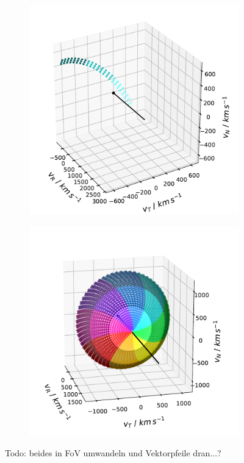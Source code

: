 %
%
%
\begin{figure}
	\centering
	\begin{subfigure}{.5\textwidth}
		\centering
		\includegraphics[width=1\linewidth]{Figures/col_single_new.pdf}
	\end{subfigure}%
	\begin{subfigure}{.5\textwidth}
		\centering
		\includegraphics[width=1\linewidth]{Figures/col_vspace_normal.pdf}
	\end{subfigure}
	\caption{Todo: beides in FoV umwandeln und Vektorpfeile dran...?}
	\label{fig:coll_FoV}
\end{figure}
